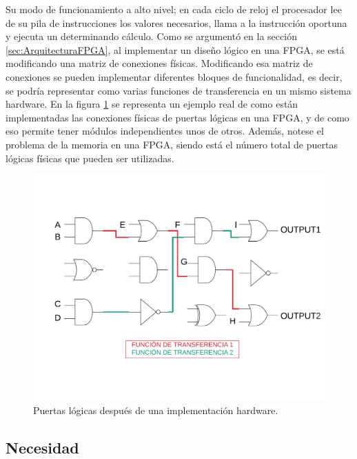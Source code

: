 Su modo de funcionamiento a alto nivel; en cada ciclo de reloj el procesador lee de su pila de instrucciones los valores necesarios, llama a la instrucción oportuna y ejecuta un determinando cálculo.\newline
Como se argumentó en la sección \ref{sec:ArquitecturaFPGA}, al implementar un diseño lógico en una FPGA, se está modificando una matriz de conexiones físicas. Modificando esa matriz de conexiones se pueden implementar diferentes bloques de funcionalidad, es decir, se podría representar como varias funciones de transferencia en un mismo sistema hardware.\newline
En la figura \ref{fig:puertas_logicas} se representa un ejemplo real de como están implementadas las conexiones físicas de puertas lógicas en una FPGA, y de como eso permite tener módulos independientes unos de otros. Además, notese el problema de la memoria en una FPGA, siendo está el número total de puertas lógicas físicas que pueden ser utilizadas.
\begin{center}
\begin{figure}[H]
	\center
	\includegraphics[scale=0.4]{imagenes/EstadoArte/puertas_logicas.pdf}
	\caption{Puertas lógicas después de una implementación hardware.}
	\label{fig:puertas_logicas}
\end{figure}
\end{center} 

\subsection{Necesidad}

